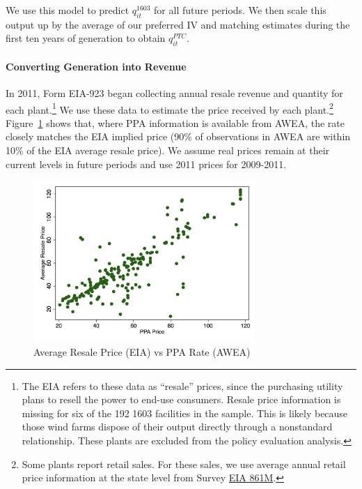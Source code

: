 \documentclass[12pt]{article}
\begin{document}
We use this model to predict $q_{it}^{1603}$ for all future periods. We then scale this output up by the average of our preferred IV and matching estimates during the first ten years of generation to obtain $q_{it}^{PTC}$.

\paragraph*{Converting Generation into Revenue}

In 2011, Form EIA-923 began collecting annual resale revenue and quantity for each plant.\footnote{The EIA refers to these data as ``resale'' prices, since the purchasing utility plans to resell the power to end-use consumers. Resale price information is missing for six of the 192 1603 facilities in the sample. This is likely because those wind farms dispose of their output directly through a nonstandard relationship. These plants are excluded from the policy evaluation analysis. } We use these data to estimate the price received by each plant.\footnote{Some plants report retail sales. For these sales, we use average annual retail price information at the state level from Survey \href{https://www.eia.gov/electricity/data/eia861m/index.html}{EIA 861M}.} Figure~\ref{fig:price_resale_ppa} shows that, where PPA information is available from AWEA, the rate closely matches the EIA implied price (90\% of observations in AWEA are within 10\% of the EIA average resale price). We assume real prices remain at their current levels in future periods and use 2011 prices for 2009-2011.

\begin{figure}[h]
\caption{Average Resale Price (EIA) vs PPA Rate (AWEA)\label{fig:price_resale_ppa}}
\centering{}\includegraphics[width=0.75\textwidth]{../output/figures/resale_vs_ppa_price.png}
\end{figure}
\end{document}

